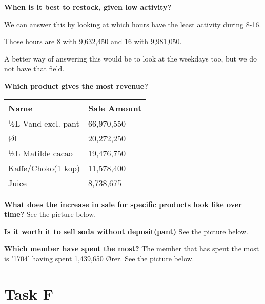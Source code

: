 	\textbf{When is it best to restock, given low activity?}
	
	We can answer this by looking at which hours have the least activity during 8-16.
	
	Those hours are 8 with 9,632,450 and 16 with 9,981,050.
	
	A better way of answering this would be to look at the weekdays too, but we do not have that field.
	
	\textbf{Which product gives the most revenue?}
	\begin{table}[H]
	    \begin{tabular}{l|l}
	    Name               & Sale Amount \\ \hline
	    ½L Vand excl. pant & 66,970,550  \\
	    Øl                 & 20,272,250  \\
	    ½L Matilde cacao   & 19,476,750  \\
	    Kaffe/Choko(1 kop) & 11,578,400  \\
	    Juice              & 8,738,675   \\
	    \end{tabular}
	\end{table}
	
	\textbf{What does the increase in sale for specific products look like over time?}
	See the picture below.
	
	\textbf{Is it worth it to sell soda without deposit(pant)}
	See the picture below.
	
	\textbf{Which member have spent the most?}
	The member that has spent the most is '1704' having spent 1,439,650 Ører.
	See the picture below.
    
    \section{Task F}

